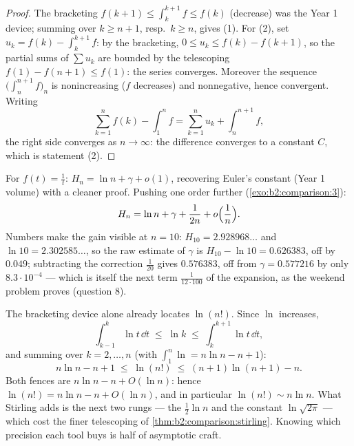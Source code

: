 \begin{proof}
The bracketing $f(k+1) \leq \int_k^{k+1} f \leq f(k)$ (decrease) was
the Year 1 device; summing over $k \geq n+1$, resp.\ $k \geq n$,
gives (1). For (2), set $u_k = f(k) - \int_k^{k+1} f$: by the
bracketing, $0 \leq u_k \leq f(k) - f(k+1)$, so the partial sums of
$\sum u_k$ are bounded by the telescoping $f(1) - f(n+1) \leq
f(1)$: the series converges. Moreover the sequence $\bigl(\int_n^{n+1}
f\bigr)_n$ is nonincreasing ($f$ decreases) and nonnegative, hence
convergent. Writing
\[
\sum_{k=1}^{n} f(k) - \int_1^n f
= \sum_{k=1}^{n} u_k + \int_n^{n+1} f ,
\]
the right side converges as $n \to \infty$: the difference converges
to a constant $C$, which is statement (2).
\end{proof}

\begin{example}\label{ex:b2:comparison:harmonic}
For $f(t) = \frac1t$: $H_n = \ln n + \gamma + o(1)$, recovering
Euler's constant (Year 1 volume) with a cleaner proof. Pushing one
order further (\cref{exo:b2:comparison:3}):
\[
H_n = \ln n + \gamma + \frac{1}{2n} + o\Bigl(\frac1n\Bigr).
\]
Numbers make the gain visible at $n = 10$: $H_{10} =
2.928968\dots$ and $\ln 10 = 2.302585\dots$, so the raw estimate
of $\gamma$ is $H_{10} - \ln 10 = 0.626383$, off by $0.049$;
subtracting the correction $\frac1{20}$ gives $0.576383$,
off from $\gamma = 0.577216$ by only $8.3\cdot10^{-4}$ ---
which is itself the next term $\frac{1}{12\cdot100}$ of the
expansion, as the weekend problem proves (question 8).
\end{example}

\begin{example}\label{ex:b2:comparison:lnfactorial}
The bracketing device alone already locates $\ln(n!)$. Since
$\ln$ increases,
\[
\int_{k-1}^{k}\ln t\,\dd t \;\leq\; \ln k \;\leq\;
\int_{k}^{k+1}\ln t\,\dd t ,
\]
and summing over $k = 2, \dots, n$ (with $\int_1^n\ln = n\ln n
- n + 1$):
\[
n\ln n - n + 1 \;\leq\; \ln(n!) \;\leq\; (n+1)\ln(n+1) - n .
\]
Both fences are $n\ln n - n + O(\ln n)$: hence $\ln(n!) = n\ln
n - n + O(\ln n)$, and in particular $\ln(n!) \sim n\ln n$.
What Stirling adds is the next two rungs --- the $\frac12\ln n$
and the constant $\ln\sqrt{2\pi}$ --- which cost the finer
telescoping of \cref{thm:b2:comparison:stirling}. Knowing
which precision each tool buys is half of asymptotic craft.
\end{example}

